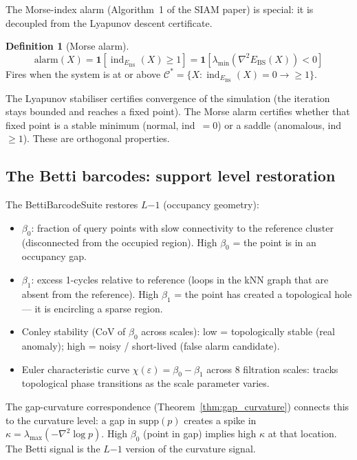 \documentclass[11pt,a4paper]{article}
\theoremstyle{definition}
\newtheorem{definition}[theorem]{Definition}
\begin{document}
The Morse-index alarm (Algorithm~1 of the SIAM paper) is special:
it is decoupled from the Lyapunov descent certificate.

\begin{definition}[Morse alarm]
\label{def:morse_alarm}
\[
\text{alarm}(X) = \mathbf{1}\left[\operatorname{ind}_{E_\text{BS}}(X) \geq 1\right]
= \mathbf{1}\left[\lambda_\text{min}(\nabla^2 E_\text{BS}(X)) < 0\right]
\]
Fires when the system is at or above $\mathcal{C}^* = \{X : \operatorname{ind}_{E_\text{BS}}(X)
= 0 \to \geq 1\}$.
\end{definition}

\noindent
The Lyapunov stabiliser certifies convergence of the simulation (the iteration
stays bounded and reaches a fixed point).
The Morse alarm certifies whether that fixed point is a stable minimum
(normal, ind~$=0$) or a saddle (anomalous, ind~$\geq 1$).
These are orthogonal properties.

\subsection{The Betti barcodes: support level restoration}

The BettiBarcodeSuite restores $L{-1}$ (occupancy geometry):

\begin{itemize}
\item $\beta_0$: fraction of query points with slow connectivity to the
  reference cluster (disconnected from the occupied region).
  High $\beta_0$ = the point is in an occupancy gap.

\item $\beta_1$: excess 1-cycles relative to reference
  (loops in the kNN graph that are absent from the reference).
  High $\beta_1$ = the point has created a topological hole ---
  it is encircling a sparse region.

\item Conley stability (CoV of $\beta_0$ across scales):
  low = topologically stable (real anomaly);
  high = noisy / short-lived (false alarm candidate).

\item Euler characteristic curve $\chi(\varepsilon) = \beta_0 - \beta_1$
  across 8 filtration scales: tracks topological phase transitions
  as the scale parameter varies.
\end{itemize}

The gap-curvature correspondence (Theorem~\ref{thm:gap_curvature}) connects
this to the curvature level: a gap in $\text{supp}(p)$ creates a spike in
$\kappa = \lambda_\text{max}(-\nabla^2\log p)$.
High $\beta_0$ (point in gap) implies high $\kappa$ at that location.
The Betti signal is the $L{-1}$ version of the curvature signal.
\end{document}
